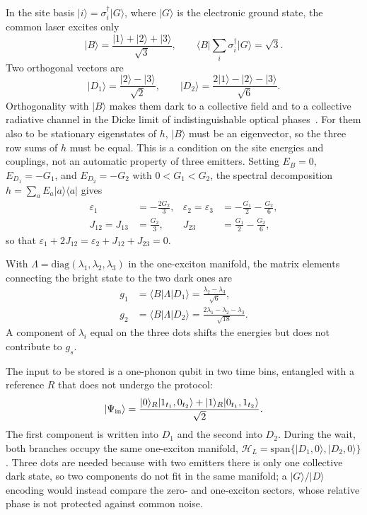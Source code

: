 \documentclass[aps,pra,preprint,groupedaddress,amsmath,amssymb,floatfix]{revtex4-2}
\newcommand{\ket}[1]{\lvert #1\rangle}
\newcommand{\bra}[1]{\langle #1\rvert}
\begin{document}
In the site basis $\ket{i}=\sigma_i^\dagger\ket{G}$, where $\ket G$ is the electronic ground state, the common laser excites only
\begin{equation}
\ket{B}=\frac{\ket1+\ket2+\ket3}{\sqrt3},\qquad
\bra{B}\sum_i\sigma_i^\dagger\ket G=\sqrt3 .\label{eq:bright}
\end{equation}
Two orthogonal vectors are
\begin{equation}
\ket{D_1}=\frac{\ket2-\ket3}{\sqrt2},\qquad
\ket{D_2}=\frac{2\ket1-\ket2-\ket3}{\sqrt6}.\label{eq:dark}
\end{equation}
Orthogonality with $\ket B$ makes them dark to a collective field and to a collective radiative channel in the Dicke limit of indistinguishable optical phases~\cite{dicke1954,mokhlespour2012}. For them also to be stationary eigenstates of $h$, $\ket B$ must be an eigenvector, so the three row sums of $h$ must be equal. This is a condition on the site energies and couplings, not an automatic property of three emitters. Setting $E_B=0$, $E_{D_1}=-G_1$, and $E_{D_2}=-G_2$ with $0<G_1<G_2$, the spectral decomposition $h=\sum_aE_a\ket a\bra a$ gives
\begin{align}
\varepsilon_1&=-\frac{2G_2}{3},&
\varepsilon_2=\varepsilon_3&=-\frac{G_1}{2}-\frac{G_2}{6},\nonumber\\
J_{12}=J_{13}&=\frac{G_2}{3},&
J_{23}&=\frac{G_1}{2}-\frac{G_2}{6},\label{eq:inverse}
\end{align}
so that $\varepsilon_1+2J_{12}=\varepsilon_2+J_{12}+J_{23}=0$.

With $\Lambda=\mathrm{diag}(\lambda_1,\lambda_2,\lambda_3)$ in the one-exciton manifold, the matrix elements connecting the bright state to the two dark ones are
\begin{align}
g_1&=\bra B\Lambda\ket{D_1}=\frac{\lambda_2-\lambda_3}{\sqrt6},\nonumber\\
g_2&=\bra B\Lambda\ket{D_2}=\frac{2\lambda_1-\lambda_2-\lambda_3}{\sqrt{18}}.\label{eq:g}
\end{align}
A component of $\lambda_i$ equal on the three dots shifts the energies but does not contribute to $g_s$.

The input to be stored is a one-phonon qubit in two time bins, entangled with a reference $R$ that does not undergo the protocol:
\begin{equation}
\ket{\Psi_{\rm in}}=\frac{\ket0_R\ket{1_{t_1},0_{t_2}}+\ket1_R\ket{0_{t_1},1_{t_2}}}{\sqrt2}.
\label{eq:input}
\end{equation}
The first component is written into $D_1$ and the second into $D_2$. During the wait, both branches occupy the same one-exciton manifold, $\mathcal H_L=\mathrm{span}\{\ket{D_1,0},\ket{D_2,0}\}$. Three dots are needed because with two emitters there is only one collective dark state, so two components do not fit in the same manifold; a $\ket G/\ket D$ encoding would instead compare the zero- and one-exciton sectors, whose relative phase is not protected against common noise.
\end{document}
